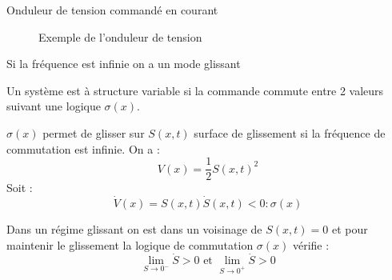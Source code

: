 \documentclass[main.tex]{subfiles}
\begin{document}
\begin{exemple}
  Onduleur de tension commandé en courant


\newsavebox{\genericfilt}
  \begin{figure}[H]\centering
  \caption{Exemple de l'onduleur de tension}
\end{figure}

Si la fréquence est infinie on a un mode glissant
\end{exemple}


\begin{defin}
  Un système est à structure variable si la commande commute entre 2 valeurs suivant une logique $\sigma(x)$.
\end{defin}
\begin{prop}
  $\sigma(x)$ permet de glisser sur $S(x,t)$ surface de glissement si la fréquence de commutation est infinie. On a :
  \[
    V(x) = \frac{1}{2}S(x,t)^2 
  \]
  Soit :
  \[
    \dot{V}(x)= S(x,t)\dot{S}(x,t) <0 : \sigma(x)
  \]
\end{prop}
Dans un régime glissant on est dans un voisinage de $S(x,t)=0$ et pour maintenir le glissement la logique de commutation $\sigma(x)$ vérifie :
\[
  \lim_{S\to0^-} \dot{S} >0 \text{ et }\lim_{S\to0^+} \dot{S}>0
\]
\end{document}

